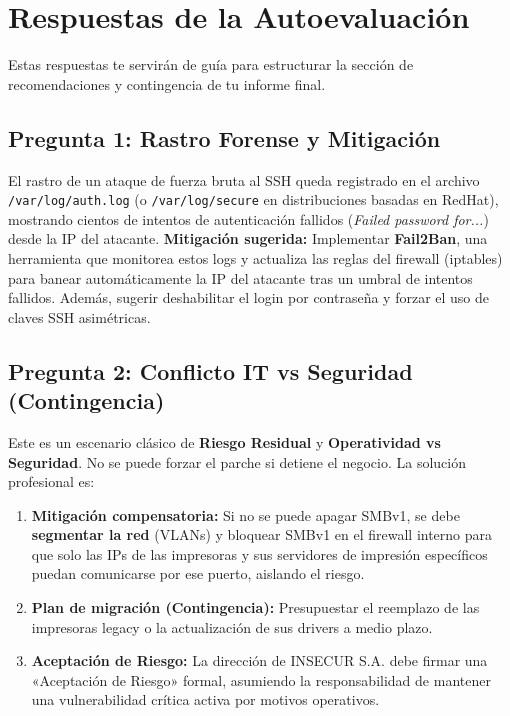 \documentclass[11pt,a4paper]{article}
\begin{document}
\section{Respuestas de la Autoevaluación}\label{sec:respuestas}

\begin{clave}
Estas respuestas te servirán de guía para estructurar la sección de recomendaciones y contingencia de tu informe final.
\end{clave}

\subsection*{Pregunta 1: Rastro Forense y Mitigación}
\begin{respuesta}
El rastro de un ataque de fuerza bruta al SSH queda registrado en el archivo \texttt{/var/log/auth.log} (o \texttt{/var/log/secure} en distribuciones basadas en RedHat), mostrando cientos de intentos de autenticación fallidos (\textit{Failed password for...}) desde la IP del atacante.
\textbf{Mitigación sugerida:} Implementar \textbf{Fail2Ban}, una herramienta que monitorea estos logs y actualiza las reglas del firewall (iptables) para banear automáticamente la IP del atacante tras un umbral de intentos fallidos. Además, sugerir deshabilitar el login por contraseña y forzar el uso de claves SSH asimétricas.
\end{respuesta}

\subsection*{Pregunta 2: Conflicto IT vs Seguridad (Contingencia)}
\begin{respuesta}
Este es un escenario clásico de \textbf{Riesgo Residual} y \textbf{Operatividad vs Seguridad}. No se puede forzar el parche si detiene el negocio. La solución profesional es:
\begin{enumerate}
  \item \textbf{Mitigación compensatoria:} Si no se puede apagar SMBv1, se debe \textbf{segmentar la red} (VLANs) y bloquear SMBv1 en el firewall interno para que solo las IPs de las impresoras y sus servidores de impresión específicos puedan comunicarse por ese puerto, aislando el riesgo.
  \item \textbf{Plan de migración (Contingencia):} Presupuestar el reemplazo de las impresoras legacy o la actualización de sus drivers a medio plazo.
  \item \textbf{Aceptación de Riesgo:} La dirección de INSECUR S.A. debe firmar una «Aceptación de Riesgo» formal, asumiendo la responsabilidad de mantener una vulnerabilidad crítica activa por motivos operativos.
\end{enumerate}
\end{respuesta}
\end{document}
